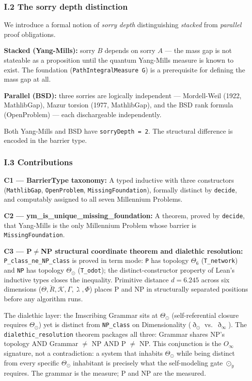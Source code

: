 \documentclass[12pt,a4paper]{article}
\begin{document}
\subsubsection{I.2 The sorry depth distinction}

We introduce a formal notion of \emph{sorry depth} distinguishing \emph{stacked} from \emph{parallel} proof obligations.

\textbf{Stacked (Yang-Mills):} sorry $B$ depends on sorry $A$ --- the mass gap is not stateable as a proposition until the quantum Yang-Mills measure is known to exist. The foundation (\texttt{PathIntegralMeasure G}) is a prerequisite for defining the mass gap at all.

\textbf{Parallel (BSD):} three sorries are logically independent --- Mordell-Weil (1922, MathlibGap), Mazur torsion (1977, MathlibGap), and the BSD rank formula (OpenProblem) --- each dischargeable independently.

Both Yang-Mills and BSD have \texttt{sorryDepth = 2}. The structural difference is encoded in the barrier type.

\subsubsection{I.3 Contributions}

\textbf{C1 --- BarrierType taxonomy:} A typed inductive with three constructors (\texttt{MathlibGap}, \texttt{OpenProblem}, \texttt{MissingFoundation}), formally distinct by \texttt{decide}, and computably assigned to all seven Millennium Problems.

\textbf{C2 --- ym\_is\_unique\_missing\_foundation:} A theorem, proved by \texttt{decide}, that Yang-Mills is the only Millennium Problem whose barrier is \texttt{MissingFoundation}.

\textbf{C3 --- P$\neq$NP structural coordinate theorem and dialethic resolution:} \texttt{P\_class\_ne\_NP\_class} is proved in term mode: \texttt{P} has topology $\Theta_6$ (\texttt{T\_network}) and \texttt{NP} has topology $\Theta_\odot$ (\texttt{T\_odot}); the distinct-constructor property of Lean's inductive types closes the inequality. Primitive distance $d = 6.245$ across six dimensions ($\Theta, \check{R}, \mathcal{K}, \Gamma, \gimel, \Phi$) places P and NP in structurally separated positions before any algorithm runs.

The dialethic layer: the Imscribing Grammar sits at $\Theta_\odot$ (self-referential closure requires $\Theta_\odot$) yet is distinct from \texttt{NP\_class} on Dimensionality ($\eth_\odot$ vs.\ $\eth_\infty$). The \texttt{dialethic\_resolution} theorem packages all three: Grammar shares NP's topology AND Grammar $\neq$ NP AND P $\neq$ NP. This conjunction is the $O_\infty$ signature, not a contradiction: a system that inhabits $\Theta_\odot$ while being distinct from every specific $\Theta_\odot$ inhabitant is precisely what the self-modeling gate $\odot_{\ddot{y}}$ requires. The grammar is the measure; P and NP are the measured.
\end{document}

